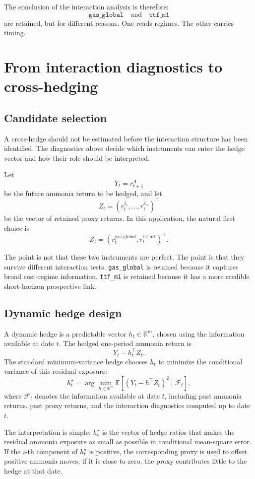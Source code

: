 \documentclass[11pt]{article}
\newcommand{\1}{\mathbf 1}
\begin{document}
The conclusion of the interaction analysis is therefore:
\[
\texttt{gas\_global}
\quad\text{and}\quad
\texttt{ttf\_m1}
\]
are retained, but for different reasons. One reads regimes. The other carries timing.

\section{From interaction diagnostics to cross-hedging}

\subsection{Candidate selection}

A cross-hedge should not be estimated before the interaction structure has been identified. The diagnostics above decide which instruments can enter the hedge vector and how their role should be interpreted.

Let
\[
Y_t=r^A_{t+1}
\]
be the future ammonia return to be hedged, and let
\[
Z_t
=
\left(
r^{j_1}_t,\ldots,r^{j_m}_t
\right)^\top
\]
be the vector of retained proxy returns. In this application, the natural first choice is
\[
Z_t
=
\left(
r^{\mathrm{gas\_global}}_t,
r^{\mathrm{ttf\_m1}}_t
\right)^\top .
\]

The point is not that these two instruments are perfect. The point is that they survive different interaction tests. \texttt{gas\_global} is retained because it captures broad cost-regime information. \texttt{ttf\_m1} is retained because it has a more credible short-horizon prospective link.

\subsection{Dynamic hedge design}

A dynamic hedge is a predictable vector $h_t \in \mathbb{R}^m$, chosen using the information available at date $t$. The hedged one-period ammonia return is
\[
Y_t - h_t^\top Z_t.
\]
The standard minimum-variance hedge chooses $h_t$ to minimize the conditional variance of this residual exposure:
\[
h_t^\star
=
\arg\min_{h \in \mathbb{R}^m}
\mathbb{E}
\left[
\left(Y_t-h^\top Z_t\right)^2
\mid
\mathcal F_t
\right],
\]
where $\mathcal F_t$ denotes the information available at date $t$, including past ammonia returns, past proxy returns, and the interaction diagnostics computed up to date $t$.

The interpretation is simple: $h_t^\star$ is the vector of hedge ratios that makes the residual ammonia exposure as small as possible in conditional mean-square error. If the $i$-th component of $h_t^\star$ is positive, the corresponding proxy is used to offset positive ammonia moves; if it is close to zero, the proxy contributes little to the hedge at that date.
\end{document}
